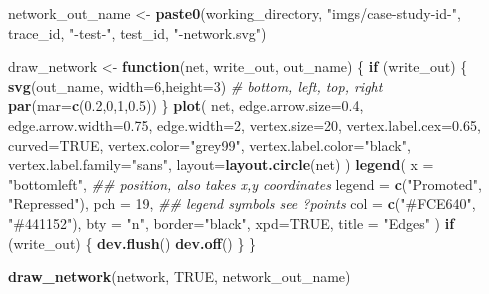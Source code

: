 \documentclass[
]{book}
\newenvironment{Shaded}{\begin{snugshade}}{\end{snugshade}}
\newcommand{\CommentTok}[1]{\textcolor[rgb]{0.56,0.35,0.01}{\textit{#1}}}
\newcommand{\ControlFlowTok}[1]{\textcolor[rgb]{0.13,0.29,0.53}{\textbf{#1}}}
\newcommand{\DataTypeTok}[1]{\textcolor[rgb]{0.13,0.29,0.53}{#1}}
\newcommand{\DecValTok}[1]{\textcolor[rgb]{0.00,0.00,0.81}{#1}}
\newcommand{\FloatTok}[1]{\textcolor[rgb]{0.00,0.00,0.81}{#1}}
\newcommand{\KeywordTok}[1]{\textcolor[rgb]{0.13,0.29,0.53}{\textbf{#1}}}
\newcommand{\NormalTok}[1]{#1}
\newcommand{\OtherTok}[1]{\textcolor[rgb]{0.56,0.35,0.01}{#1}}
\newcommand{\StringTok}[1]{\textcolor[rgb]{0.31,0.60,0.02}{#1}}
\begin{document}
\begin{Shaded}
\begin{Highlighting}[]
\NormalTok{network\_out\_name \textless{}{-}}\StringTok{ }\KeywordTok{paste0}\NormalTok{(working\_directory, }\StringTok{"imgs/case{-}study{-}id{-}"}\NormalTok{, trace\_id, }\StringTok{"{-}test{-}"}\NormalTok{, test\_id, }\StringTok{"{-}network.svg"}\NormalTok{)}

\NormalTok{draw\_network \textless{}{-}}\StringTok{ }\ControlFlowTok{function}\NormalTok{(net, write\_out, out\_name) \{}
  \ControlFlowTok{if}\NormalTok{ (write\_out) \{}
    \KeywordTok{svg}\NormalTok{(out\_name, }\DataTypeTok{width=}\DecValTok{6}\NormalTok{,}\DataTypeTok{height=}\DecValTok{3}\NormalTok{)}
    \CommentTok{\# bottom, left, top, right}
    \KeywordTok{par}\NormalTok{(}\DataTypeTok{mar=}\KeywordTok{c}\NormalTok{(}\FloatTok{0.2}\NormalTok{,}\DecValTok{0}\NormalTok{,}\DecValTok{1}\NormalTok{,}\FloatTok{0.5}\NormalTok{))}
\NormalTok{  \}}
  \KeywordTok{plot}\NormalTok{(}
\NormalTok{    net,}
    \DataTypeTok{edge.arrow.size=}\FloatTok{0.4}\NormalTok{,}
    \DataTypeTok{edge.arrow.width=}\FloatTok{0.75}\NormalTok{,}
    \DataTypeTok{edge.width=}\DecValTok{2}\NormalTok{,}
    \DataTypeTok{vertex.size=}\DecValTok{20}\NormalTok{,}
    \DataTypeTok{vertex.label.cex=}\FloatTok{0.65}\NormalTok{,}
    \DataTypeTok{curved=}\OtherTok{TRUE}\NormalTok{,}
    \DataTypeTok{vertex.color=}\StringTok{"grey99"}\NormalTok{,}
    \DataTypeTok{vertex.label.color=}\StringTok{"black"}\NormalTok{,}
    \DataTypeTok{vertex.label.family=}\StringTok{"sans"}\NormalTok{,}
    \DataTypeTok{layout=}\KeywordTok{layout.circle}\NormalTok{(net)}
\NormalTok{  )}
  \KeywordTok{legend}\NormalTok{(}
    \DataTypeTok{x =} \StringTok{"bottomleft"}\NormalTok{,      }\CommentTok{\#\# position, also takes x,y coordinates}
    \DataTypeTok{legend =} \KeywordTok{c}\NormalTok{(}\StringTok{"Promoted"}\NormalTok{, }\StringTok{"Repressed"}\NormalTok{),}
    \DataTypeTok{pch =} \DecValTok{19}\NormalTok{,              }\CommentTok{\#\# legend symbols see ?points}
    \DataTypeTok{col =} \KeywordTok{c}\NormalTok{(}\StringTok{"\#FCE640"}\NormalTok{, }\StringTok{"\#441152"}\NormalTok{),}
    \DataTypeTok{bty =} \StringTok{"n"}\NormalTok{,}
    \DataTypeTok{border=}\StringTok{"black"}\NormalTok{,}
    \DataTypeTok{xpd=}\OtherTok{TRUE}\NormalTok{,}
    \DataTypeTok{title =} \StringTok{"Edges"}
\NormalTok{  )}
  \ControlFlowTok{if}\NormalTok{ (write\_out) \{}
    \KeywordTok{dev.flush}\NormalTok{()}
    \KeywordTok{dev.off}\NormalTok{()}
\NormalTok{  \}}
\NormalTok{\}}

\KeywordTok{draw\_network}\NormalTok{(network, }\OtherTok{TRUE}\NormalTok{, network\_out\_name)}
\end{Highlighting}
\end{Shaded}
\end{document}
